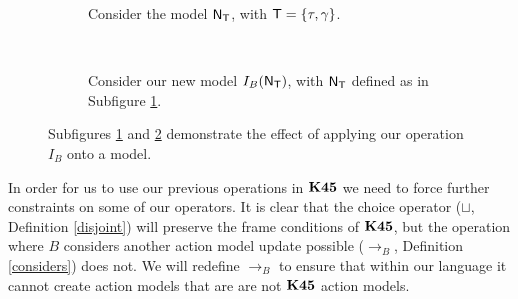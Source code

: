 \begin{figure}
\centering
\begin{subfigure}[b]{.45\textwidth}
\centering
{}
\caption{Consider the model $\mathrm{\mathsf{N}}_\mathrm{\mathsf{T}}$, with $\mathrm{\mathsf{T}} = \{\tau, \gamma\}$.}
\label{beforeOperation}
\end{subfigure}
~
\begin{subfigure}[b]{.45\textwidth}
\centering
{}
\caption{Consider our new model $I_B(\mathrm{\mathsf{N}}_\mathrm{\mathsf{T}})$, with $\mathrm{\mathsf{N}}_\mathrm{\mathsf{T}}$ defined as in Subfigure
\ref{beforeOperation}.}
\label{afterOperation}
\end{subfigure}
\caption[Result of applying $I_B$]{Subfigures \ref{beforeOperation} and \ref{afterOperation} demonstrate the effect of
applying our operation $I_B$ onto a model.}
\label{beforeAfterI}
\end{figure}

In order for us to use our previous operations in $\bf K45$ we need to force further constraints on
some of our operators.
It is clear that the choice operator ($\sqcup$, Definition \ref{disjoint}) will preserve the frame
conditions of $\bf K45$, but the operation where $B$ considers another action model update possible
($\to_B$, Definition \ref{considers}) does not.
We will redefine $\to_B$ to ensure that within our language it cannot create action models that are
are not $\bf K45$ action models.

